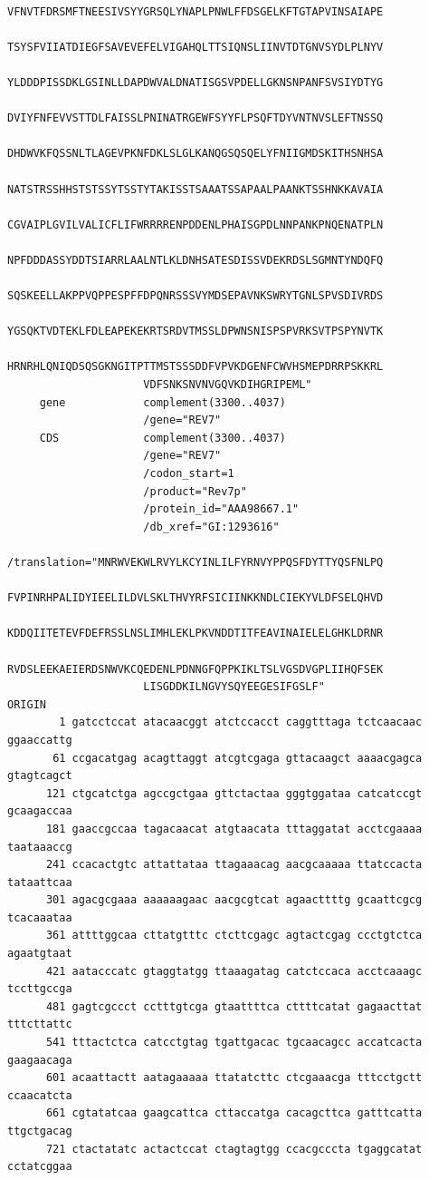 \documentclass[11pt]{article}
\begin{document}
\begin{verbatim}
                     VFNVTFDRSMFTNEESIVSYYGRSQLYNAPLPNWLFFDSGELKFTGTAPVINSAIAPE
                     TSYSFVIIATDIEGFSAVEVEFELVIGAHQLTTSIQNSLIINVTDTGNVSYDLPLNYV
                     YLDDDPISSDKLGSINLLDAPDWVALDNATISGSVPDELLGKNSNPANFSVSIYDTYG
                     DVIYFNFEVVSTTDLFAISSLPNINATRGEWFSYYFLPSQFTDYVNTNVSLEFTNSSQ
                     DHDWVKFQSSNLTLAGEVPKNFDKLSLGLKANQGSQSQELYFNIIGMDSKITHSNHSA
                     NATSTRSSHHSTSTSSYTSSTYTAKISSTSAAATSSAPAALPAANKTSSHNKKAVAIA
                     CGVAIPLGVILVALICFLIFWRRRRENPDDENLPHAISGPDLNNPANKPNQENATPLN
                     NPFDDDASSYDDTSIARRLAALNTLKLDNHSATESDISSVDEKRDSLSGMNTYNDQFQ
                     SQSKEELLAKPPVQPPESPFFDPQNRSSSVYMDSEPAVNKSWRYTGNLSPVSDIVRDS
                     YGSQKTVDTEKLFDLEAPEKEKRTSRDVTMSSLDPWNSNISPSPVRKSVTPSPYNVTK
                     HRNRHLQNIQDSQSGKNGITPTTMSTSSSDDFVPVKDGENFCWVHSMEPDRRPSKKRL
                     VDFSNKSNVNVGQVKDIHGRIPEML"
     gene            complement(3300..4037)
                     /gene="REV7"
     CDS             complement(3300..4037)
                     /gene="REV7"
                     /codon_start=1
                     /product="Rev7p"
                     /protein_id="AAA98667.1"
                     /db_xref="GI:1293616"
                     /translation="MNRWVEKWLRVYLKCYINLILFYRNVYPPQSFDYTTYQSFNLPQ
                     FVPINRHPALIDYIEELILDVLSKLTHVYRFSICIINKKNDLCIEKYVLDFSELQHVD
                     KDDQIITETEVFDEFRSSLNSLIMHLEKLPKVNDDTITFEAVINAIELELGHKLDRNR
                     RVDSLEEKAEIERDSNWVKCQEDENLPDNNGFQPPKIKLTSLVGSDVGPLIIHQFSEK
                     LISGDDKILNGVYSQYEEGESIFGSLF"
ORIGIN
        1 gatcctccat atacaacggt atctccacct caggtttaga tctcaacaac ggaaccattg
       61 ccgacatgag acagttaggt atcgtcgaga gttacaagct aaaacgagca gtagtcagct
      121 ctgcatctga agccgctgaa gttctactaa gggtggataa catcatccgt gcaagaccaa
      181 gaaccgccaa tagacaacat atgtaacata tttaggatat acctcgaaaa taataaaccg
      241 ccacactgtc attattataa ttagaaacag aacgcaaaaa ttatccacta tataattcaa
      301 agacgcgaaa aaaaaagaac aacgcgtcat agaacttttg gcaattcgcg tcacaaataa
      361 attttggcaa cttatgtttc ctcttcgagc agtactcgag ccctgtctca agaatgtaat
      421 aatacccatc gtaggtatgg ttaaagatag catctccaca acctcaaagc tccttgccga
      481 gagtcgccct cctttgtcga gtaattttca cttttcatat gagaacttat tttcttattc
      541 tttactctca catcctgtag tgattgacac tgcaacagcc accatcacta gaagaacaga
      601 acaattactt aatagaaaaa ttatatcttc ctcgaaacga tttcctgctt ccaacatcta
      661 cgtatatcaa gaagcattca cttaccatga cacagcttca gatttcatta ttgctgacag
      721 ctactatatc actactccat ctagtagtgg ccacgcccta tgaggcatat cctatcggaa

\end{verbatim}
\end{document}
